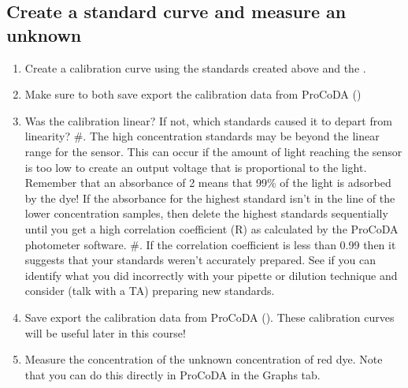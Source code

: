 \documentclass[letterpaper,10pt,english]{sphinxmanual}
\begin{document}
\subsection{Create a standard curve and measure an unknown}
\label{\detokenize{Laboratory_Measurements/Laboratory_Measurements:create-a-standard-curve-and-measure-an-unknown}}\begin{enumerate}
\item {} 
Create a calibration curve using the standards created above and the {\hyperref[\detokenize{ProCoDA/ProCoDA:heading-procoda-photometer}]{}}.

\item {} 
Make sure to both save  export the calibration data from ProCoDA ()

\item {} 
Was the calibration linear? If not, which standards caused it to depart from linearity?
\#. The high concentration standards may be beyond the linear range for the sensor. This can occur if the amount of light reaching the sensor is too low to create an output voltage that is proportional to the light. Remember that an absorbance of 2 means that 99\% of the light is adsorbed by the dye! If the absorbance for the highest standard isn’t in the line of the lower concentration samples, then delete the highest standards sequentially until you get a high correlation coefficient (R) as calculated by the ProCoDA photometer software.
\#. If the correlation coefficient is less than 0.99 then it suggests that your standards weren’t accurately prepared. See if you can identify what you did incorrectly with your pipette or dilution technique and consider (talk with a TA) preparing new standards.

\item {} 
Save  export the calibration data from ProCoDA (). These calibration curves will be useful later in this course!

\item {} 
Measure the concentration of the unknown concentration of red dye. Note that you can do this directly in ProCoDA in the Graphs tab.

\end{enumerate}
\end{document}
